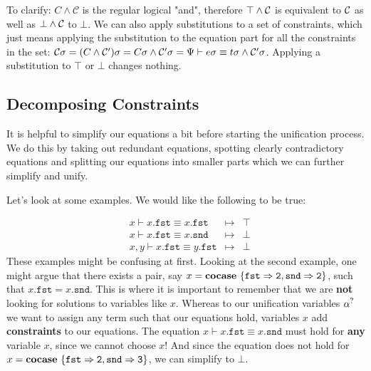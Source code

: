 \documentclass[twoside,12pt,a4paper]{article}
\begin{document}
To clarify: $C \wedge \mathcal{C}$ is the regular logical "and", therefore 
$\top \wedge \mathcal{C}$ is equivalent to $\mathcal{C}$ as well as $\bot \wedge \mathcal{C}$ to $\bot$.
We can also apply substitutions to a set of constraints, which just means applying the substitution to the equation part for all the constraints in the set:
$\mathcal{C} \sigma = (C \wedge \mathcal{C}')\sigma = C \sigma \wedge \mathcal{C}' \sigma  
= \Psi \vdash e\sigma\equiv t\sigma\wedge \mathcal{C}'\sigma$. Applying a substitution to $\top$ or $\bot$ changes nothing.

\subsection{Decomposing Constraints}

It is helpful to simplify our equations a bit before starting the unification process.
We do this by taking out redundant equations, spotting clearly contradictory equations and splitting our equations into smaller parts which we can further simplify and unify.

Let's look at some examples. We would like the following to be true:
\begin{example}
    \begin{align*}
    &x \vdash x.\mathtt{fst} \equiv x.\mathtt{fst} &\mapsto& \top
    \tag{1}\\
    &x \vdash x.\mathtt{fst} \equiv x.\mathtt{snd} &\mapsto& \bot 
    \tag{2}\\
    &x,y \vdash x.\mathtt{fst} \equiv y.\mathtt{fst} &\mapsto& \bot 
    \tag{3}
    \end{align*}
    These examples might be confusing at first. Looking at the second example, one might argue that there exists a pair, say $x = \textbf{cocase}\ \{\mathtt{fst\Rightarrow 2, snd\Rightarrow 2}\}$, such that
    $x.\mathtt{fst} = x.\mathtt{snd}$. This is where it is important to remember that we are \textbf{not} looking for solutions to variables like $x$.
    Whereas to our unification variables $\alpha^?$ we want to assign any term such that our equations hold, variables $x$ add \textbf{constraints} to our equations. 
    The equation $x \vdash x.\mathtt{fst} \equiv x.\mathtt{snd}$ must hold for \textbf{any} variable $x$, since we cannot choose $x$! 
    And since the equation does not hold for $x = \textbf{cocase}\ \{\mathtt{fst\Rightarrow 2, snd\Rightarrow 3}\}$, we can simplify to $\bot$.
\end{example}
\end{document}
